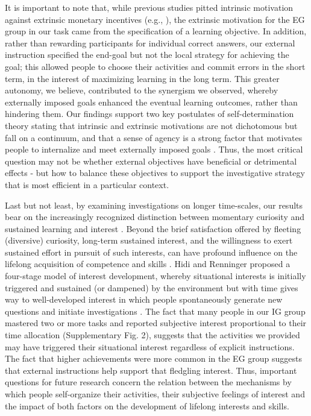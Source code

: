     It is important to note that, while previous studies pitted intrinsic motivation against extrinsic monetary incentives (e.g., \cite{murayama2019motivated}), the extrinsic motivation for the EG group in our task came from the specification of a learning objective. In addition, rather than rewarding participants for individual correct answers, our external instruction specified the end-goal but not the local strategy for achieving the goal; this allowed people to choose their activities and commit errors in the short term, in the interest of maximizing learning in the long term. This greater autonomy, we believe, contributed to the synergism we observed, whereby externally imposed goals enhanced the eventual learning outcomes, rather than hindering them. Our findings support two key postulates of self-determination theory stating that intrinsic and extrinsic motivations are not dichotomous but fall on a continuum, and that a sense of agency is a strong factor that motivates people to internalize and meet externally imposed goals \cite{ryan2000intrinsic}. Thus, the most critical question may not be whether external objectives have beneficial or detrimental effects - but how to balance these objectives to support the investigative strategy that is most efficient in a particular context.
   
    Last but not least, by examining investigations on longer time-scales, our results bear on the increasingly recognized distinction between momentary curiosity and sustained learning and interest \cite{hidi2019interest,murayama2019process}. Beyond the brief satisfaction offered by fleeting (diversive) curiosity, long-term sustained interest, and the willingness to exert sustained effort in pursuit of such interests, can have profound influence on the lifelong acquisition of competence and skills \cite{hidi2019interest,hidi2006four}. Hidi and Renninger \cite{hidi2019interest,hidi2006four} proposed a four-stage model of interest development, whereby situational interests is initially triggered and sustained (or dampened) by the environment but with time gives way to well-developed interest in which people spontaneously generate new questions and initiate investigations \cite{son2000metacognitive}. The fact that many people in our IG group mastered two or more tasks and reported subjective interest proportional to their time allocation (Supplementary Fig. 2), suggests that the activities we provided may have triggered their situational interest regardless of explicit instructions. The fact that higher achievements were more common in the EG group suggests that external instructions help support that fledgling interest. Thus, important questions for future research concern the relation between the mechanisms by which people self-organize their activities, their subjective feelings of interest and the impact of both factors on the development of lifelong interests and skills.
   
